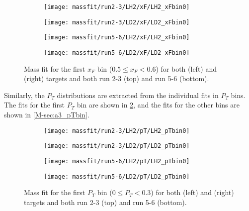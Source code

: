 \documentclass[../main.tex]{subfiles}
\begin{document}
\begin{figure}[h!]
	\centering
	\begin{subfigure}{0.45\linewidth}
		\texttt{[image: massfit/run2-3/LH2/xF/LH2\_xFbin0]}
	\end{subfigure}
	\begin{subfigure}{0.45\linewidth}
		\texttt{[image: massfit/run2-3/LD2/xF/LD2\_xFbin0]}
	\end{subfigure}
	\begin{subfigure}{0.45\linewidth}
		\texttt{[image: massfit/run5-6/LH2/xF/LH2\_xFbin0]}
	\end{subfigure}
	\begin{subfigure}{0.45\linewidth}
		\texttt{[image: massfit/run5-6/LD2/xF/LD2\_xFbin0]}
	\end{subfigure}
	\caption{Mass fit for the first $x_F$ bin ($0.5\leq x_F<0.6$) for both  (left) and  (right) targets
		and both run 2-3 (top) and run 5-6 (bottom). }
	\label{fig:massfit_1st_xF}
\end{figure}
Similarly, the $P_T$ distributions are extracted from the individual fits in $P_T$ bins.
The fits for the first $P_T$ bin are shown in \cref{fig:massfit_1st_pT},
and the fits for the other bins are shown in \cref{M-sec:a3_pTbin}.
\begin{figure}[h!]
	\centering
	\begin{subfigure}{0.45\linewidth}
		\texttt{[image: massfit/run2-3/LH2/pT/LH2\_pTbin0]}
	\end{subfigure}
	\begin{subfigure}{0.45\linewidth}
		\texttt{[image: massfit/run2-3/LD2/pT/LD2\_pTbin0]}
	\end{subfigure}
	\begin{subfigure}{0.45\linewidth}
		\texttt{[image: massfit/run5-6/LH2/pT/LH2\_pTbin0]}
	\end{subfigure}
	\begin{subfigure}{0.45\linewidth}
		\texttt{[image: massfit/run5-6/LD2/pT/LD2\_pTbin0]}
	\end{subfigure}
	\caption{Mass fit for the first $P_T$ bin ($0\leq P_T<0.3$) for both  (left) and  (right) targets
		and both run 2-3 (top) and run 5-6 (bottom). }
	\label{fig:massfit_1st_pT}
\end{figure}
\FloatBarrier
\end{document}
